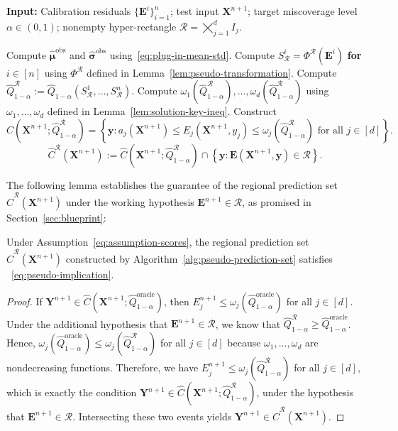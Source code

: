 \begin{algorithm}[!htbp]
\caption{Construction of regional prediction sets under the working hypothesis $\mathbf E^{n+1}\in\mathcal R$}
\label{alg:pseudo-prediction-set}

\textbf{Input:} Calibration residuals $\{\mathbf E^i\}_{i=1}^n$; test input $\mathbf X^{n+1}$; target miscoverage level $\alpha\in(0,1)$; nonempty hyper-rectangle $\mathcal R=\bigtimes_{j=1}^d I_j$.

\begin{algorithmic}[1]
\State Compute $\hat{\boldsymbol\mu}^{\mathrm{obs}}$ and $\hat{\boldsymbol\sigma}^{\mathrm{obs}}$ using~\eqref{eq:plug-in-mean-std}.
\State Compute $S^i_{\mathcal R}=\Phi^{\mathcal R}(\mathbf E^i)$ \textbf{for} $i\in[n]$ using $\Phi^{\mathcal R}$ defined in Lemma~\ref{lem:pseudo-transformation}.
\State Compute $\hat Q^{\mathcal R}_{1-\alpha}:=\hat Q_{1-\alpha}(S^1_{\mathcal R},\ldots,S^n_{\mathcal R})$.
\State Compute $\omega_1(\hat Q^{\mathcal R}_{1-\alpha}),\ldots,\omega_d(\hat Q^{\mathcal R}_{1-\alpha})$ using $\omega_1,\ldots,\omega_d$ defined in Lemma~\ref{lem:solution-key-ineq}.
\State Construct
\[
\hat C(\mathbf X^{n+1};\hat Q^{\mathcal R}_{1-\alpha})
=
\left\{
\mathbf y:
a_j(\mathbf X^{n+1})
\leq E_j(\mathbf X^{n+1},y_j)
\leq\omega_j(\hat Q^{\mathcal R}_{1-\alpha})
\text{ for all }j\in[d]
\right\}.
\]
\State \Return
\[
\hat C^{\mathcal R}(\mathbf X^{n+1})
:=
\hat C(\mathbf X^{n+1};\hat Q^{\mathcal R}_{1-\alpha})
\cap
\left\{
\mathbf y:
\mathbf E(\mathbf X^{n+1},\mathbf y)\in\mathcal R
\right\}.
\]
\end{algorithmic}
\end{algorithm}

The following lemma establishes the guarantee of the regional prediction set $\hat C^{\mathcal R}(\mathbf X^{n+1})$ under the working hypothesis $\mathbf E^{n+1}\in\mathcal R$, as promised in Section~\ref{sec:blueprint}:

\begin{lemma}\label{lem:pseudo-guarantee}
Under Assumption~\ref{eq:assumption-scores}, the regional prediction set $\hat C^{\mathcal R}(\mathbf X^{n+1})$ constructed by Algorithm~\ref{alg:pseudo-prediction-set} satisfies
~\eqref{eq:pseudo-implication}.
\end{lemma}

\begin{proof}
If $\mathbf Y^{n+1}\in\hat C(\mathbf X^{n+1};\hat Q^{\mathrm{oracle}}_{1-\alpha})$, then $E_j^{n+1}\leq\omega_j(\hat Q^{\mathrm{oracle}}_{1-\alpha})$ for all $j\in[d]$. Under the additional hypothesis that $\mathbf E^{n+1}\in\mathcal R$, we know that $\hat Q^{\mathcal R}_{1-\alpha}\geq\hat Q^{\mathrm{oracle}}_{1-\alpha}$. Hence, $\omega_j(\hat Q^{\mathrm{oracle}}_{1-\alpha})
\leq
\omega_j(\hat Q^{\mathcal R}_{1-\alpha})$
for all $j\in[d]$ because $\omega_1,\ldots,\omega_d$ are nondecreasing functions. Therefore, we have $E_j^{n+1}\leq\omega_j(\hat Q^{\mathcal R}_{1-\alpha})$ for all $j\in[d]$, which is exactly the condition
$\mathbf Y^{n+1}\in\hat C(\mathbf X^{n+1};\hat Q^{\mathcal R}_{1-\alpha})$,
under the hypothesis that $\mathbf E^{n+1}\in\mathcal R$. Intersecting these two events yields $\mathbf Y^{n+1}\in\hat C^{\mathcal R}(\mathbf X^{n+1})$.
\end{proof}

